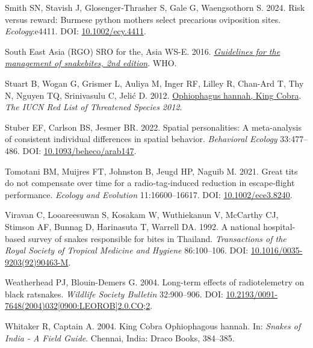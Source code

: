 \documentclass[10pt,a4paper]{article}
\newlength{\cslhangindent}
\newenvironment{CSLReferences}[2] %
 {\begin{list}{}{%
  \setlength{\itemindent}{0pt}
  \setlength{\leftmargin}{0pt}
  \setlength{\parsep}{0pt}
  \ifodd #1
   \setlength{\leftmargin}{\cslhangindent}
   \setlength{\itemindent}{-1\cslhangindent}
  \fi
  \setlength{\itemsep}{#2\baselineskip}}}
 {\end{list}}
\begin{document}
\begin{CSLReferences}{1}{0}
Smith SN, Stavish J, Glosenger‐Thrasher S, Gale G, Waengsothorn S. 2024. Risk versus reward: {Burmese} python mothers select precarious oviposition sites. \emph{Ecology}:e4411. DOI: \href{https://doi.org/10.1002/ecy.4411}{10.1002/ecy.4411}.

South East Asia (RGO) SRO for the, Asia WS-E. 2016. \emph{\href{https://www.who.int/publications/i/item/9789290225300}{Guidelines for the management of snakebites, 2nd edition}}. WHO.

Stuart B, Wogan G, Grismer L, Auliya M, Inger RF, Lilley R, Chan-Ard T, Thy N, Nguyen TQ, Srinivasulu C, Jelić D. 2012. \href{http://dx.doi.org/10.2305/IUCN.UK.2012-\%201.RLTS.T177540A1491874.en\%0ACopyright:}{Ophiophagus hannah, {King} {Cobra}}. \emph{The IUCN Red List of Threatened Species 2012}.

Stuber EF, Carlson BS, Jesmer BR. 2022. Spatial personalities: A meta-analysis of consistent individual differences in spatial behavior. \emph{Behavioral Ecology} 33:477--486. DOI: \href{https://doi.org/10.1093/beheco/arab147}{10.1093/beheco/arab147}.

Tomotani BM, Muijres FT, Johnston B, Jeugd HP, Naguib M. 2021. Great tits do not compensate over time for a radio‐tag‐induced reduction in escape‐flight performance. \emph{Ecology and Evolution} 11:16600--16617. DOI: \href{https://doi.org/10.1002/ece3.8240}{10.1002/ece3.8240}.

Viravan C, Looareesuwan S, Kosakam W, Wuthiekanun V, McCarthy CJ, Stimson AF, Bunnag D, Harinasuta T, Warrell DA. 1992. A national hospital-based survey of snakes responsible for bites in {Thailand}. \emph{Transactions of the Royal Society of Tropical Medicine and Hygiene} 86:100--106. DOI: \href{https://doi.org/10.1016/0035-9203(92)90463-M}{10.1016/0035-9203(92)90463-M}.

Weatherhead PJ, Blouin-Demers G. 2004. Long-term effects of radiotelemetry on black ratsnakes. \emph{Wildlife Society Bulletin} 32:900--906. DOI: \href{https://doi.org/10.2193/0091-7648(2004)032\%5B0900:LEOROB\%5D2.0.CO;2}{10.2193/0091-7648(2004)032{[}0900:LEOROB{]}2.0.CO;2}.

Whitaker R, Captain A. 2004. King {Cobra} {Ophiophagous} hannah. In: \emph{Snakes of {India} - {A} {Field} {Guide}}. Chennai, India: Draco Books, 384--385.


\end{CSLReferences}
\end{document}
